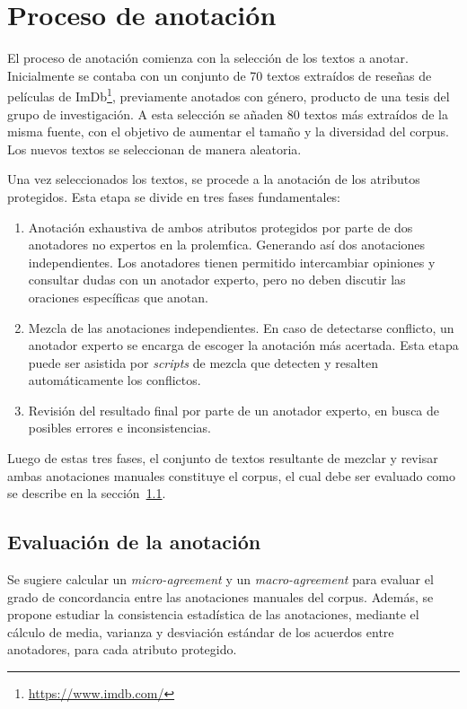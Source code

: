 \section{Proceso de anotaci\'on}\label{section:annotation_process}
El proceso de anotaci\'on comienza con la selecci\'on de los textos a anotar. Inicialmente se contaba con un conjunto de 70 textos 
extra\'idos de rese\~nas de pel\'iculas de ImDb\footnote{\url{https://www.imdb.com/}}, previamente anotados con g\'enero, producto 
de una tesis del grupo de investigaci\'on. A esta selecci\'on se a\~naden 80 textos m\'as extra\'idos de la misma fuente, con el 
objetivo de aumentar el tama\~no y la diversidad del corpus. Los nuevos textos se seleccionan de manera aleatoria.

Una vez seleccionados los textos, se procede a la anotaci\'on de los atributos protegidos. Esta etapa se divide en tres fases 
fundamentales:

\begin{enumerate}
    \item Anotaci\'on exhaustiva de ambos atributos protegidos por parte de dos anotadores no expertos en la prolem\'tica. 
    Generando as\'i dos anotaciones independientes. Los anotadores tienen permitido intercambiar opiniones y consultar dudas
    con un anotador experto, pero no deben discutir las oraciones espec\'ificas que anotan.
    \item Mezcla de las anotaciones independientes. En caso de detectarse conflicto, un anotador experto se encarga de escoger la 
    anotaci\'on m\'as acertada. Esta etapa puede ser asistida por \emph{scripts} de mezcla que detecten y resalten autom\'aticamente
    los conflictos.
    \item Revisi\'on del resultado final por parte de un anotador experto, en busca de posibles errores e inconsistencias.
\end{enumerate}

Luego de estas tres fases, el conjunto de textos resultante de mezclar y revisar ambas anotaciones manuales constituye el corpus, el 
cual debe ser evaluado como se describe en la secci\'on~\ref{subsection:annotation_evaluation}.

\subsection{Evaluaci\'on de la anotaci\'on}\label{subsection:annotation_evaluation}
Se sugiere calcular un \emph{micro-agreement} y un \emph{macro-agreement} para evaluar el grado de concordancia entre las anotaciones
manuales del corpus. Adem\'as, se propone estudiar la consistencia estad\'istica de las anotaciones, mediante el c\'alculo  
de media, varianza y desviaci\'on est\'andar de los acuerdos entre anotadores, para cada atributo protegido.

